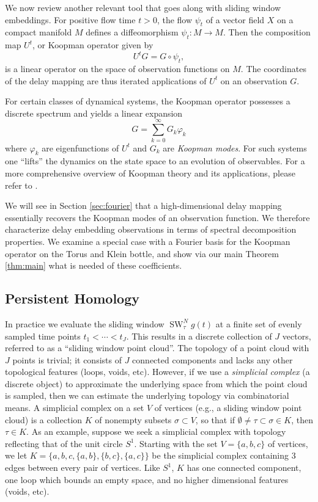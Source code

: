 \documentclass[11pt]{article}
\theoremstyle{definition}
\theoremstyle{remark}
\let\phi\varphi
\DeclareMathOperator{\SW}{SW}
\begin{document}
    We now review another relevant tool that goes along with sliding window embeddings. For positive flow time $t>0$, the flow $\psi_t$ of a vector field $X$ on a compact manifold $M$ defines a diffeomorphism $\psi_t: M \rightarrow M$. Then the composition map $U^t$, or Koopman operator \cite{Koopman315, das2017delay, Mezic} given by
    \[U^tG = G \circ \psi_t,\]
    is a linear operator on the space of observation functions on $M$. The coordinates of the delay mapping are thus iterated applications of $U^t$ on an observation $G$.

    For certain classes of dynamical systems, the Koopman operator possesses a discrete spectrum and yields a linear expansion
    \[G = \sum_{k=0}^\infty G_k\phi_k\]
    where $\phi_k$ are eigenfunctions of $U^t$ and $G_k$ are \textit{Koopman modes}. For such systems one ``lifts'' the dynamics on the state space to an evolution of observables. For a more comprehensive overview of Koopman theory and its applications, please refer to \cite{koopmanbackground}.

    We will see in Section \ref{sec:fourier} that a high-dimensional delay mapping essentially recovers the Koopman modes of an observation function. We therefore characterize delay embedding observations in terms of spectral decomposition properties. We examine a special case with a Fourier basis for the Koopman operator on the Torus and Klein bottle, and show via our main Theorem \ref{thm:main}  what is needed of these coefficients.


    \subsection{Persistent Homology}

    In practice we evaluate the sliding window $\SW^N_\tau g(t)$ at a finite set of evenly sampled time points $t_1 < \cdots < t_J$.
    This results in a discrete collection of $J$ vectors, referred to as a ``sliding window point cloud''.
    The topology of a point cloud with $J$ points is trivial; it consists of $J$ connected components
    and lacks any other topological features (loops, voids, etc).
    However, if we use a {\em simplicial complex} (a discrete object) to  approximate the underlying space from which the point cloud is sampled,
    then we can estimate the underlying topology via combinatorial means.
    A simplicial complex on a set $V$ of vertices (e.g., a sliding window point cloud) is a collection  $K$ of nonempty subsets
    $\sigma \subset V$, so that if $\emptyset \neq \tau \subset \sigma \in K$, then $\tau \in K$.
    As an example, suppose we seek a simplicial complex with  topology reflecting that of the unit circle $S^1$.
    Starting with the set $V = \{a, b, c\}$ of vertices, we let
    $K = \{a, b, c, \{a, b\}, \{b, c\}, \{a, c\} \}$ be the simplicial complex containing 3 edges between every pair of vertices.
    Like $S^1$, $K$ has one connected component,
    one loop which bounds an empty space, and no higher dimensional features (voids, etc).
\end{document}
